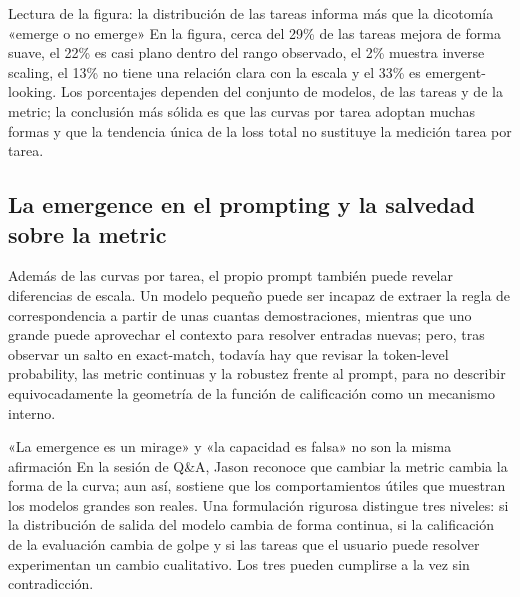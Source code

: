 
\begin{knowledgebox}{Lectura de la figura: la distribución de las tareas informa más que la dicotomía «emerge o no emerge»}
En la figura, cerca del 29\% de las tareas mejora de forma suave, el 22\% es casi plano dentro del rango observado, el 2\% muestra inverse scaling, el 13\% no tiene una relación clara con la escala y el 33\% es emergent-looking. Los porcentajes dependen del conjunto de modelos, de las tareas y de la metric; la conclusión más sólida es que las curvas por tarea adoptan muchas formas y que la tendencia única de la loss total no sustituye la medición tarea por tarea.
\end{knowledgebox}


\subsection{La emergence en el prompting y la salvedad sobre la metric}

Además de las curvas por tarea, el propio prompt también puede revelar diferencias de escala. Un modelo pequeño puede ser incapaz de extraer la regla de correspondencia a partir de unas cuantas demostraciones, mientras que uno grande puede aprovechar el contexto para resolver entradas nuevas; pero, tras observar un salto en exact-match, todavía hay que revisar la token-level probability, las metric continuas y la robustez frente al prompt, para no describir equivocadamente la geometría de la función de calificación como un mecanismo interno.


\begin{warningbox}{«La emergence es un mirage» y «la capacidad es falsa» no son la misma afirmación}
En la sesión de Q\&A, Jason reconoce que cambiar la metric cambia la forma de la curva; aun así, sostiene que los comportamientos útiles que muestran los modelos grandes son reales. Una formulación rigurosa distingue tres niveles: si la distribución de salida del modelo cambia de forma continua, si la calificación de la evaluación cambia de golpe y si las tareas que el usuario puede resolver experimentan un cambio cualitativo. Los tres pueden cumplirse a la vez sin contradicción.
\end{warningbox}


